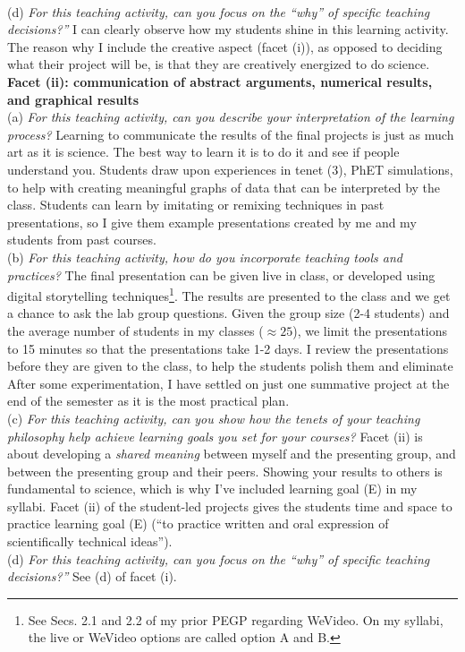 \documentclass[../../../main.tex]{subfiles}
\begin{document}
\\
\vspace{0.25cm}
(d) \textit{For this teaching activity, can you focus on the ``why'' of specific teaching decisions?''}  I can clearly observe how my students shine in this learning activity.  The reason why I include the creative aspect (facet (i)), as opposed to deciding what their project will be, is that they are creatively energized to do science.
\\
\vspace{0.25cm}
\textbf{Facet (ii): communication of abstract arguments, numerical results, and graphical results}
\\
\vspace{0.25cm}
(a) \textit{For this teaching activity, can you describe your interpretation of the learning process?}  Learning to communicate the results of the final projects is just as much art as it is science.  The best way to learn it is to do it and see if people understand you.  Students draw upon experiences in tenet (3), PhET simulations, to help with creating meaningful graphs of data that can be interpreted by the class.  Students can learn by imitating or remixing techniques in past presentations, so I give them example presentations created by me and my students from past courses.
\\
\vspace{0.25cm}
(b) \textit{For this teaching activity, how do you incorporate teaching tools and practices?}  The final presentation can be given live in class, or developed using digital storytelling techniques\footnote{See Secs. 2.1 and 2.2 of my prior PEGP regarding WeVideo.  On my syllabi, the live or WeVideo options are called option A and B.}.  The results are presented to the class and we get a chance to ask the lab group questions.  Given the group size (2-4 students) and the average number of students in my classes ($\approx 25$), we limit the presentations to 15 minutes so that the presentations take 1-2 days.  I review the presentations before they are given to the class, to help the students polish them and eliminate   After some experimentation, I have settled on just one summative project at the end of the semester as it is the most practical plan.
\\
\vspace{0.25cm}
(c) \textit{For this teaching activity, can you show how the tenets of your teaching philosophy help achieve learning goals you set for your courses?}  Facet (ii) is about developing a \textit{shared meaning} between myself and the presenting group, and between the presenting group and their peers.  Showing your results to others is fundamental to science, which is why I've included learning goal (E) in my syllabi.  Facet (ii) of the student-led projects gives the students time and space to practice learning goal (E) (``to practice written and oral expression of scientifically technical ideas'').
\\
\vspace{0.25cm}
(d) \textit{For this teaching activity, can you focus on the ``why'' of specific teaching decisions?''}  See (d) of facet (i).
\end{document}
